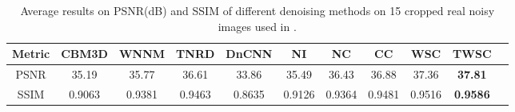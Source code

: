 \begin{table}[hbp]
\caption{Average results on PSNR(dB) and SSIM of different denoising methods on 15 cropped real noisy images used in \cite{crosschannel2016}.}
\label{t3}

\begin{center}
\renewcommand\arraystretch{1}
\scriptsize
\begin{tabular*}{1\textwidth}{@{\extracolsep{\fill}}ccccccccccc}
\hline
Metric
&
\textbf{CBM3D}
&
\textbf{WNNM}
&
\textbf{TNRD}
&
\textbf{DnCNN}
&
\textbf{NI}
&
\textbf{NC}
&
\textbf{CC}
&
\textbf{WSC}
&
\textbf{TWSC}
\\
\hline
PSNR & 35.19 & 35.77 & 36.61 & 33.86 & 35.49 & 36.43  & 36.88 & 37.36 & \textbf{37.81}
\\
\hline
SSIM & 0.9063 & 0.9381 & 0.9463 & 0.8635 & 0.9126 & 0.9364 & 0.9481 & 0.9516 & \textbf{0.9586}
\\
\hline
\end{tabular*}
\end{center}
\end{table}


